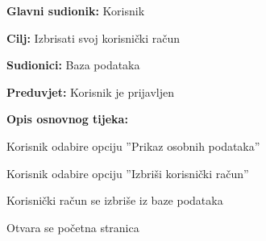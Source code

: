 					\noindent {}
					\begin{packed_item}
						
						\item \textbf{Glavni sudionik: }Korisnik
						\item  \textbf{Cilj:} Izbrisati svoj korisnički račun
						\item  \textbf{Sudionici:} Baza podataka
						\item  \textbf{Preduvjet:} Korisnik je prijavljen
						\item  \textbf{Opis osnovnog tijeka:}
						
						\item[] \begin{packed_enum}
							
							\item Korisnik odabire opciju ”Prikaz osobnih podataka”
							\item Korisnik odabire opciju ”Izbriši korisnički račun”
							\item Korisnički račun se izbriše iz baze podataka
							\item Otvara se početna stranica
						\end{packed_enum}

					\end{packed_item}
					

